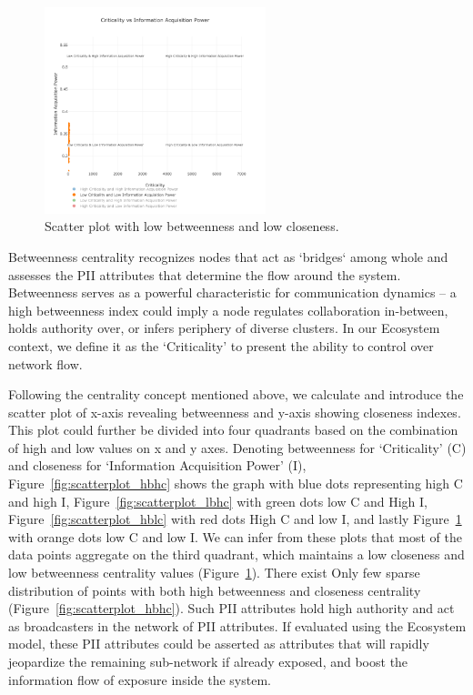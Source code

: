 \documentclass[conference]{IEEEtran}
\begin{document}
\begin{figure}[h!]
  \includegraphics[width=\linewidth, height=6cm]{scatterplot_orange.png}
  \caption{Scatter plot with low betweenness and low closeness.}
  \label{fig:scatterplot_lblc}
\end{figure}

Betweenness centrality recognizes nodes that act as `bridges` among whole and assesses the PII attributes that determine the flow around the system. Betweenness serves as a powerful characteristic for communication dynamics -- a high betweenness index could imply a node regulates collaboration in-between, holds authority over,  or infers periphery of diverse clusters. In our Ecosystem context, we define it as the `Criticality' to present the ability to control over network flow.




Following the centrality concept mentioned above, we calculate and introduce the scatter plot of x-axis revealing betweenness and y-axis showing closeness indexes.  This plot could further be divided into four quadrants based on the combination of high and low values on x and y axes. Denoting betweenness for `Criticality' (C) and closeness for `Information Acquisition Power' (I), Figure~\ref{fig:scatterplot_hbhc} shows the graph with blue dots representing high C and high I, Figure~\ref{fig:scatterplot_lbhc} with green dots low C and High I, Figure~\ref{fig:scatterplot_hblc} with red dots High C and low I, and lastly Figure~\ref{fig:scatterplot_lblc} with orange dots low C and low I. We can infer from these plots that most of the data points aggregate on the third quadrant, which maintains a low closeness and low betweenness centrality values (Figure~\ref{fig:scatterplot_lblc}). There exist Only few sparse distribution of points with both high betweenness and closeness centrality (Figure~\ref{fig:scatterplot_hbhc}). Such PII attributes hold high authority and act as broadcasters in the network of PII attributes. If evaluated using the Ecosystem model, these PII attributes could be asserted as attributes that will rapidly jeopardize the remaining sub-network if already exposed, and boost the information flow of exposure inside the system.
\end{document}

